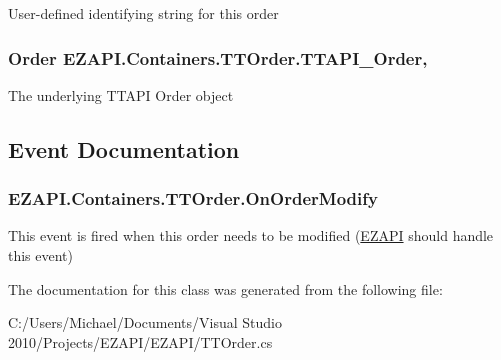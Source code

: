 User-\/defined identifying string for this order 

\hypertarget{class_e_z_a_p_i_1_1_containers_1_1_t_t_order_a609ce2ae0f91344af295767e1719b822}{
\subsubsection[{T\-T\-A\-P\-I\-\_\-\-Order}]{\setlength{\rightskip}{0pt plus 5cm}Order E\-Z\-A\-P\-I.\-Containers.\-T\-T\-Order.\-T\-T\-A\-P\-I\-\_\-\-Order\hspace{0.3cm}{\ttfamily [get]}, {\ttfamily [set]}}}\label{class_e_z_a_p_i_1_1_containers_1_1_t_t_order_a609ce2ae0f91344af295767e1719b822}


The underlying T\-T\-A\-P\-I Order object 



\subsection{Event Documentation}
\hypertarget{class_e_z_a_p_i_1_1_containers_1_1_t_t_order_af8ea72d173cc82c929ad27d2f0bc3df2}{
\subsubsection[{On\-Order\-Modify}]{ E\-Z\-A\-P\-I.\-Containers.\-T\-T\-Order.\-On\-Order\-Modify}}\label{class_e_z_a_p_i_1_1_containers_1_1_t_t_order_af8ea72d173cc82c929ad27d2f0bc3df2}


This event is fired when this order needs to be modified (\hyperlink{namespace_e_z_a_p_i}{E\-Z\-A\-P\-I} should handle this event) 



The documentation for this class was generated from the following file\-:\begin{DoxyCompactItemize}
\item 
C\-:/\-Users/\-Michael/\-Documents/\-Visual Studio 2010/\-Projects/\-E\-Z\-A\-P\-I/\-E\-Z\-A\-P\-I/T\-T\-Order.\-cs\end{DoxyCompactItemize}
